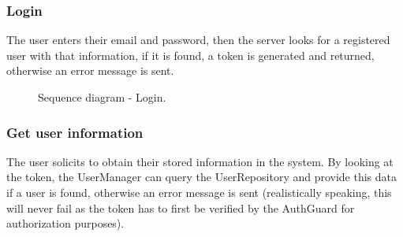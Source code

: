 \subsubsection{Login}
The user enters their email and password, then the server looks for a registered user with that information, if it is found, a token is generated and returned, otherwise an error message is sent.

\begin{figure}[H]
    \centering
    \caption{\label{fig:sequence-registration}Sequence diagram - Login.}
\end{figure}

\subsubsection{Get user information}
The user solicits to obtain their stored information in the system. By looking at the token, the UserManager can query the UserRepository and provide this data if a user is found, otherwise an error message is sent (realistically speaking, this will never fail as the token has to first be verified by the AuthGuard for authorization purposes).

